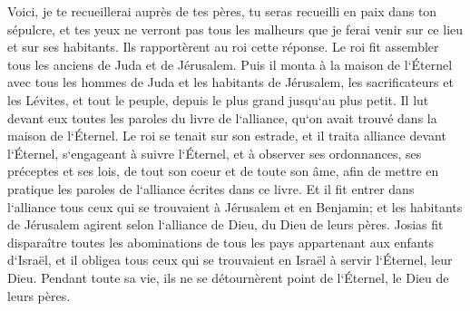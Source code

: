 \verse Voici, je te recueillerai auprès de tes pères, tu seras recueilli en paix dans ton sépulcre, et tes yeux ne verront pas tous les malheurs que je ferai venir sur ce lieu et sur ses habitants. Ils rapportèrent au roi cette réponse. 
\verse Le roi fit assembler tous les anciens de Juda et de Jérusalem. 
\verse Puis il monta à la maison de l`Éternel avec tous les hommes de Juda et les habitants de Jérusalem, les sacrificateurs et les Lévites, et tout le peuple, depuis le plus grand jusqu`au plus petit. Il lut devant eux toutes les paroles du livre de l`alliance, qu`on avait trouvé dans la maison de l`Éternel. 
\verse Le roi se tenait sur son estrade, et il traita alliance devant l`Éternel, s`engageant à suivre l`Éternel, et à observer ses ordonnances, ses préceptes et ses lois, de tout son coeur et de toute son âme, afin de mettre en pratique les paroles de l`alliance écrites dans ce livre. 
\verse Et il fit entrer dans l`alliance tous ceux qui se trouvaient à Jérusalem et en Benjamin; et les habitants de Jérusalem agirent selon l`alliance de Dieu, du Dieu de leurs pères. 
\verse Josias fit disparaître toutes les abominations de tous les pays appartenant aux enfants d`Israël, et il obligea tous ceux qui se trouvaient en Israël à servir l`Éternel, leur Dieu. Pendant toute sa vie, ils ne se détournèrent point de l`Éternel, le Dieu de leurs pères. 

